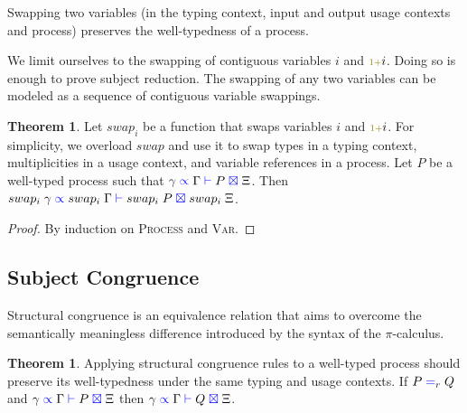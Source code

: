 \documentclass[a4paper,UKenglish,cleveref, autoref, thm-restate,authorcolumns]{lipics-v2019}
\theoremstyle{definition}
\newtheorem{nitheorem}[theorem]{Theorem}
\newcommand{\picalc}{$\pi$-calculus}
\newcommand{\type}[1]{\textcolor{blue}{\operatorname{#1}}}
\newcommand{\constr}[1]{\textcolor{olive}{\operatorname{#1}}}
\newcommand{\suc}{\constr{\scriptstyle 1+}}
\newcommand{\types}[4]{#1 \; \type{\propto} \; #2 \; \type{\vdash} \; #3 \; \type{\boxtimes} \; #4}
\newcommand{\eq}[1]{\; \type{=}_{#1} \;}
\begin{document}
Swapping two variables (in the typing context, input and output usage contexts and process) preserves the well-typedness of a process.

\begin{remark}
  We limit ourselves to the swapping of contiguous variables $i$ and $\suc i$.
  Doing so is enough to prove subject reduction.
  The swapping of any two variables can be modeled as a sequence of contiguous variable swappings.
\end{remark}


\begin{nitheorem}
  \label{thm:swapping}
  Let $swap_i$ be a function that swaps variables $i$ and $\suc i$.
  For simplicity, we overload $swap$ and use it to swap types in a typing context, multiplicities in a usage context, and variable references in a process.
  Let $P$ be a well-typed process such that $\types{\gamma}{\Gamma}{P}{\Xi}$.
  Then $\types{swap_i \; \gamma}{swap_i \; \Gamma}{swap_i \; P}{swap_i \; \Xi}$.
\end{nitheorem}
\begin{proof}
  By induction on \textsc{Process} and \textsc{Var}.
\end{proof}

\subsection{Subject Congruence}
\label{subject-congruence}

Structural congruence is an equivalence relation that aims to overcome the semantically meaningless difference introduced by the syntax of the \picalc{}.

\begin{nitheorem}
  \label{thm:subject-congruence}
  Applying structural congruence rules to a well-typed process should preserve its well-typedness under the same typing and usage contexts.
  If $P \eq{r} Q$ and $\types{\gamma}{\Gamma}{P}{\Xi}$ then $\types{\gamma}{\Gamma}{Q}{\Xi}$.
\end{nitheorem}
\end{document}
